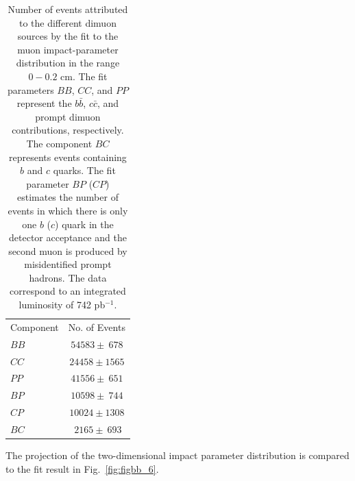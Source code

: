 \documentclass[aps,prd,preprint,floatfix,nofootinbib,superscriptaddress,showpacs,amssymb]{revtex4}
\begin{document}
 \begin{table}
 \caption[]{Number of events attributed to the different dimuon sources by
           the fit to the muon impact-parameter distribution in the range
           $0-0.2$ cm.  The fit parameters $BB$, $CC$, and $PP$ represent 
           the $b\bar{b}$, $c\bar{c}$, and prompt dimuon contributions, 
           respectively. The component $BC$ represents events containing
           $b$ and $c$ quarks. The fit parameter $BP$ ($CP$) estimates
           the number of events in which there is only one $b$ ($c$) quark
           in the detector acceptance and the second muon is produced by  
           misidentified prompt hadrons. The data correspond to an
           integrated luminosity of 742 pb$^{-1}$. }
 \begin{center}
 \begin{ruledtabular}
 \begin{tabular}{lc}
 Component  &  No. of Events      \\
  $BB$      & $54583 \pm ~678$    \\ 
  $CC$      & $24458 \pm 1565$    \\
  $PP$      & $41556 \pm ~651$    \\
  $BP$      & $10598 \pm ~744$    \\
  $CP$      & $10024 \pm 1308$    \\
  $BC$      & $~2165 \pm ~693$    \\
 \end{tabular}
 \end{ruledtabular}
 \end{center}
 \label{tab:tab_1}
 \end{table}
 The projection of the two-dimensional impact parameter distribution is 
 compared to the fit result in Fig.~\ref{fig:figbb_6}.
\end{document}
